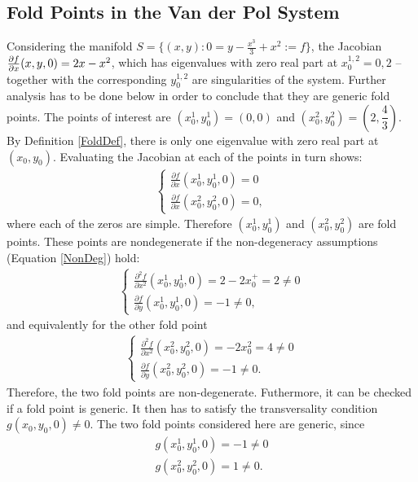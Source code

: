 \subsection{Fold Points in the Van der Pol System }
Considering the manifold $S= \{ (x,y) : 0=y-\frac{x^3}{3}+x^2:=f \}$, the Jacobian $\pd{f}{x}(x,y,0) = 2x-x^2 $, which has eigenvalues with zero real part at $x^{1,2}_0= 0,2$ -- together with the corresponding $y^{1,2}_0$ are singularities of the system.
Further analysis has to be done below in order to conclude that they are generic fold points.
The points of interest are $(x_0^1,y_0^1)=(0,0)$ and $(x_0^2,y_0^2)=\left(2,\dfrac{4}{3}\right)$. By Definition \ref{FoldDef}, there is only one eigenvalue with zero real part at $(x_0,y_0)$. Evaluating the Jacobian at each of the points in turn shows:
\begin{align*}
\begin{cases}
\frac{ \partial f}{\partial x}(x_0^1,y_0^1,0) =0 \\
\frac{ \partial f}{\partial x}(x_0^2,y_0^2,0) =0,
\end{cases}
\end{align*}
where each of the zeros are simple.
Therefore $(x_0^1,y_0^1)$ and $(x_0^2,y_0^2)$ are fold points.
These points are nondegenerate if the non-degeneracy assumptions (Equation \ref{NonDeg}) hold:
\begin{align*}
\begin{cases}
\frac{ \partial ^2 f}{ \partial x^2} (x_0^1,y_0^1, 0) = 2-2 x_0^+ = 2 \neq 0 \\
\frac{\partial f}{\partial y}(x_0^1,y_0^1, 0) = -1 \neq 0,
\end{cases}
\end{align*}
and equivalently for the other fold point
\begin{align*}
\begin{cases}
\frac{ \partial ^2 f}{ \partial x^2} (x_0^2,y_0^2,0) = -2 x_0^2 =4\neq 0 \\
\frac{\partial f}{\partial y}(x_0^2,y_0^2, 0) = -1 \neq 0.
\end{cases}
\end{align*}
Therefore, the two fold points are non-degenerate.
Futhermore, it can be checked if a fold point is generic. It then has to satisfy the transversality condition $g(x_0,y_0,0) \neq 0$.
The two fold points considered here are generic, since 
\begin{align*}
g(x_0^1,y_0^1,0)= -1\neq 0 \\
g(x_0^2,y_0^2,0)= 1 \neq 0.
\end{align*}

